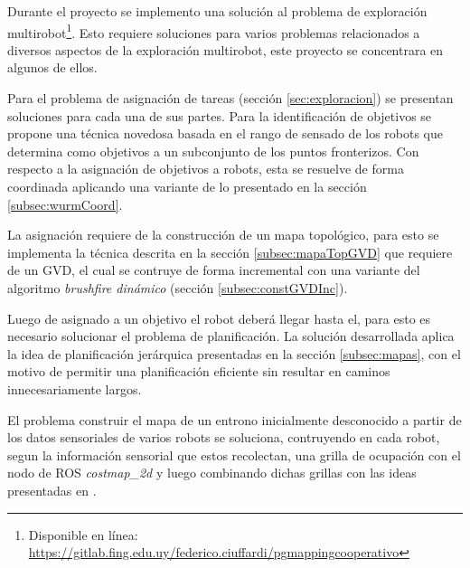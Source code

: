 Durante el proyecto se implemento una solución al problema de exploración
multirobot\footnote{Disponible en línea:\\
\url{https://gitlab.fing.edu.uy/federico.ciuffardi/pgmappingcooperativo}}. Esto
requiere soluciones para varios problemas relacionados a diversos aspectos de
la exploración multirobot, este proyecto se concentrara en algunos de ellos.

Para el problema de asignación de tareas (sección \ref{sec:exploracion}) se
presentan soluciones para cada una de sus partes. Para la identificación de
objetivos se propone una técnica novedosa basada en el rango de sensado de los
robots que determina como objetivos a un subconjunto de los puntos fronterizos.
Con respecto a la asignación de objetivos a robots, esta se resuelve de forma
coordinada aplicando una variante de lo presentado en la sección
\ref{subsec:wurmCoord}.

La asignación requiere de la construcción de un mapa topológico, para esto se
implementa la técnica descrita en la sección \ref{subsec:mapaTopGVD} que
requiere de un GVD, el cual se contruye de forma incremental con una variante
del algoritmo \emph{brushfire dinámico} (sección \ref{subsec:constGVDInc}).

Luego de asignado a un objetivo el robot deberá llegar hasta el, para esto es
necesario solucionar el problema de planificación. La solución desarrollada
aplica la idea de planificación jerárquica presentadas en la sección
\ref{subsec:mapas}, con el motivo de permitir una planificación eficiente sin
resultar en caminos innecesariamente largos.

El problema construir el mapa de un entrono inicialmente desconocido a partir
de los datos sensoriales de varios robots se soluciona, contruyendo en cada
robot, segun la información sensorial que estos recolectan, una grilla de
ocupación con el nodo de ROS \emph{costmap\_2d} \cite{ROS-costmap_2d} y luego
combinando dichas grillas con las ideas presentadas en
\cite{stachniss2009robotic}.




